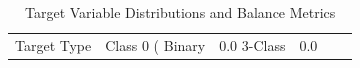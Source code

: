 \begin{table}
\caption{Target Variable Distributions and Balance Metrics}
\label{tab:target_distributions}
\begin{tabular}{llllll}
\toprule
Target Type & Class 0 (%
\midrule
Binary & 0.0%
3-Class & 0.0%
\bottomrule
\end{tabular}
\end{table}
